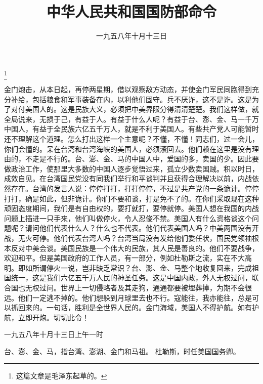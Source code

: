 
\title{中华人民共和国国防部命令}
\date{一九五八年十月十三日}
\thanks{这篇文章是毛泽东起草的。}
\maketitle



金门炮击，从本日起，再停两星期，借以观察敌方动态，并使金门军民同胞得到充分补给，包括粮食和军事装备在内，以利他们固守。兵不厌诈，这不是诈。这是为了对付美国人的。这是民族大义，必须把中美界限分得清清楚楚。我们这样做，就全局说来，无损于己，有益于人。有益于什么人呢？有益于台、澎、金、马一千万中国人，有益于全民族六亿五千万人，就是不利于美国人。有些共产党人可能暂时还不理解这个道理。怎么打出这样一个主意呢？不懂，不懂！同志们，过一会儿，你们会懂的。呆在台湾和台湾海峡的美国人，必须滚回去。他们赖在这里是没有理由的，不走是不行的。台、澎、金、马的中国人中，爱国的多，卖国的少。因此要做政治工作，使那里大多数的中国人逐步觉悟过来，孤立少数卖国贼。积以时日，成效自见。在台湾国民党没有同我们举行和平谈判并且获得合理解决以前，内战依然存在。台湾的发言人说：停停打打，打打停停，不过是共产党的一条诡计。停停打打，确是如此，但非诡计。你们不要和谈，打是免不了的。在你们采取现在这种顽固态度期间，我们是有自由权的，要打就打，要停就停。美国人想在我国的内战问题上插进一只手来，他们叫做停火，令人忍俊不禁。美国人有什么资格谈这个问题呢？请问他们代表什么人？什么也不代表。他们代表美国人吗？中美两国没有开战，无火可停。他们代表台湾人吗？台湾当局没有发给他们委任状，国民党领袖根本反对中美会谈。美国民族是一个伟大的民族，其人民是善良的。他们不要战争，欢迎和平。但是美国政府的工作人员，有一部分，例如杜勒斯之流，实在不大高明。即如所谓停火一说，岂非缺乏常识？台、澎、金、马整个地收复回来，完成祖国统一，这是我们六亿五千万人民的神圣任务。这是中国内政，外人无权过问，联合国也无权过问。世界上一切侵略者及其走狗，通通都要被埋葬掉，为期不会很远。他们一定逃不掉的。他们想躲到月球里去也不行。寇能往，我亦能往，总是可以抓回来的。一句话，胜利是全世界人民的。金门海域，美国人不得护航。如有护航，立即开炮。切切此令！

一九五八年十月十三日上午一时

\begin{maonote}
台、澎、金、马，指台湾、澎湖、金门和马祖。
杜勒斯，时任美国国务卿。
\end{maonote}
